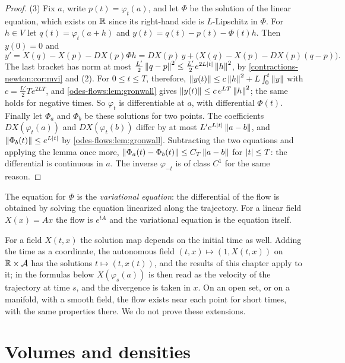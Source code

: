 \begin{notechapter}
\begin{proof}
(3) Fix $a$, write $p(t) = \varphi_t(a)$, and let $\Phi$ be the
solution of the linear equation, which exists on $\mathbb{R}$ since its
right-hand side is $L$-Lipschitz in $\Phi$. For $h\in V$ let
$q(t) = \varphi_t(a + h)$ and $y(t) = q(t) - p(t) - \Phi(t)h$. Then
$y(0) = 0$ and
\[
  y' = X(q) - X(p) - DX(p)\Phi h
     = DX(p)\,y + \bigl(X(q) - X(p) - DX(p)(q - p)\bigr) .
\]
The last bracket has norm at most
$\frac{L'}2\left\|q - p\right\|^2\leq\frac{L'}2e^{2L\left|t\right|}\left\|h\right\|^2$, by
\cref{contractions-newton:cor:mvi} and (2). For $0\leq t\leq T$,
therefore,
$\left\|y(t)\right\|\leq c\left\|h\right\|^2 + L\int_0^t\left\|y\right\|$ with
$c = \frac{L'}2Te^{2LT}$, and \cref{odes-flows:lem:gronwall} gives
$\left\|y(t)\right\|\leq c\,e^{LT}\left\|h\right\|^2$; the same holds for negative
times. So $\varphi_t$ is differentiable at $a$, with differential
$\Phi(t)$. Finally let $\Phi_a$ and $\Phi_b$ be these solutions for two
points. The coefficients $DX(\varphi_t(a))$ and $DX(\varphi_t(b))$
differ by at most $L'e^{L\left|t\right|}\left\|a - b\right\|$, and
$\left\|\Phi_b(t)\right\|\leq e^{L\left|t\right|}$ by \cref{odes-flows:lem:gronwall}.
Subtracting the two equations and applying the lemma once more,
$\left\|\Phi_a(t) - \Phi_b(t)\right\|\leq C_T\left\|a - b\right\|$ for
$\left|t\right|\leq T$: the differential is continuous in $a$. The inverse
$\varphi_{-t}$ is of class $C^1$ for the same reason.
\end{proof}

The equation for $\Phi$ is the \emph{variational equation}: the
differential of the flow is obtained by solving the equation
linearized along the trajectory. For a linear field $X(x) = Ax$ the
flow is $e^{tA}$ and the variational equation is the equation itself.

\begin{remark}
\label{odes-flows:rem:time}
For a field $X(t, x)$ the solution map depends on the initial time as
well. Adding the time as a coordinate, the autonomous field
$(t, x)\mapsto(1, X(t, x))$ on $\mathbb{R}\times\mathcal{A}$ has the solutions
$t\mapsto(t, x(t))$, and the results of this chapter apply to it; in
the formulas below $X(\varphi_s(a))$ is then read as the velocity of
the trajectory at time $s$, and the divergence is taken in $x$. On an
open set, or on a manifold, with a smooth field, the flow exists near
each point for short times, with the same properties there. We do not
prove these extensions.
\end{remark}

\section{Volumes and densities}\label{odes-flows:sec:transport}


\end{notechapter}
